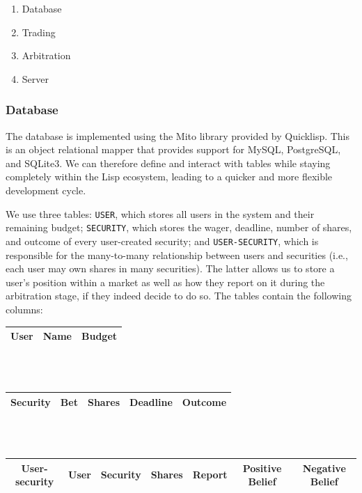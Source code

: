 \documentclass[10pt,a4paper]{article}
\theoremstyle{plain}
\theoremstyle{definition}
\newcommand{\code}[1]{\texttt{#1}}
\begin{document}
\begin{enumerate}
	\itemsep0em
	\item Database
	\item Trading
	\item Arbitration
	\item Server
\end{enumerate}

\subsubsection{Database}

The database is implemented using the Mito library provided by Quicklisp. This
is an object relational mapper that provides support for MySQL, PostgreSQL, and
SQLite3. We can therefore define and interact with tables while staying
completely within the Lisp ecosystem, leading to a quicker and more flexible
development cycle.

We use three tables: \code{USER}, which stores all users in the system and
their remaining budget; \code{SECURITY}, which stores the wager, deadline,
number of shares, and outcome of every user-created security; and
\code{USER-SECURITY}, which is responsible for the many-to-many relationship
between users and securities (i.e., each user may own shares in many
securities). The latter allows us to store a user's position within a market as
well as how they report on it during the arbitration stage, if they indeed
decide to do so. The tables contain the following columns:

\begin{table}[ht]
	\centering
	\begin{tabular}{|c|c|c|}
		\hline
		\textbf{User} & Name & Budget \\ \hline
	\end{tabular} \\~\\

	\begin{tabular}{|c|c|c|c|c|}
		\hline
		\textbf{Security} & Bet & Shares & Deadline & Outcome \\ \hline
	\end{tabular} \\~\\

	\begin{tabular}{|c|c|c|c|c|c|c|}
		\hline
		\textbf{User-security} & User & Security & Shares & Report & Positive Belief & Negative Belief \\ \hline
	\end{tabular} \\~\\
\end{table}
\end{document}
